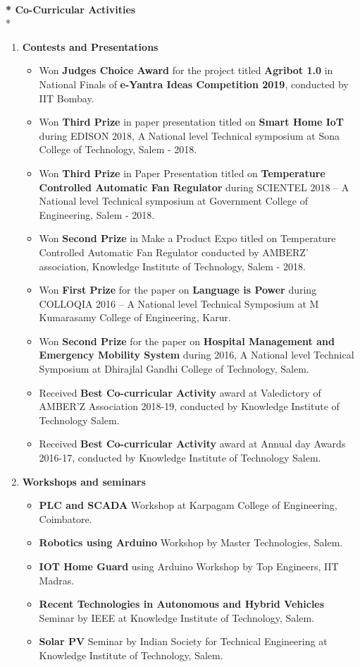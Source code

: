 \documentclass{article}
\begin{document}
\begin{flushleft}
 \textbf{\\* Co-Curricular Activities}
\\*
\begin{enumerate}
\item \textbf{Contests and Presentations}
\begin{itemize}
\item Won \textbf{Judges Choice Award} for the project titled \textbf{Agribot 1.0} in National Finals of \textbf{e-Yantra Ideas Competition 2019}, conducted by IIT Bombay.
\item Won \textbf{Third Prize} in paper presentation titled on \textbf{Smart Home IoT} during EDISON 2018, A National level Technical symposium at Sona College of Technology, Salem - 2018.
\item Won \textbf{Third Prize} in Paper Presentation titled on \textbf{Temperature Controlled Automatic Fan Regulator} during SCIENTEL 2018 – A National level Technical symposium at Government College of Engineering, Salem - 2018.
\item Won \textbf{Second Prize} in Make a Product Expo titled on Temperature Controlled Automatic Fan Regulator conducted by AMBERZ’ association, Knowledge Institute of Technology, Salem - 2018.
\item Won \textbf{First Prize} for the paper on \textbf{Language is Power} during COLLOQIA 2016 – A National level Technical Symposium at M Kumarasamy College of Engineering, Karur.
\item Won \textbf{Second Prize} for the paper on \textbf{Hospital Management and Emergency Mobility System } during 2016,  A National level Technical Symposium at Dhirajlal Gandhi College of Technology, Salem. 
\item Received \textbf{ Best Co-curricular Activity} award at Valedictory of AMBER'Z Association 2018-19, conducted by Knowledge Institute of Technology Salem.
\item Received \textbf{ Best Co-curricular Activity} award at Annual day Awards 2016-17, conducted by Knowledge Institute of Technology Salem.
\end{itemize}

\item \textbf{Workshops and seminars}
\begin{itemize}
\item \textbf{PLC and SCADA} Workshop at Karpagam College of Engineering, Coimbatore.
\item \textbf{Robotics using Arduino} Workshop by Master Technologies, Salem.
\item\textbf{IOT Home Guard} using Arduino Workshop by Top Engineers, IIT Madras.
\item\textbf{Recent Technologies in Autonomous and Hybrid Vehicles} Seminar by IEEE at Knowledge Institute of Technology, Salem.
\item \textbf{Solar PV} Seminar by Indian Society for Technical Engineering at Knowledge Institute of Technology, Salem. 


\end{itemize}
\end{enumerate}
\end{flushleft}
\end{document}
